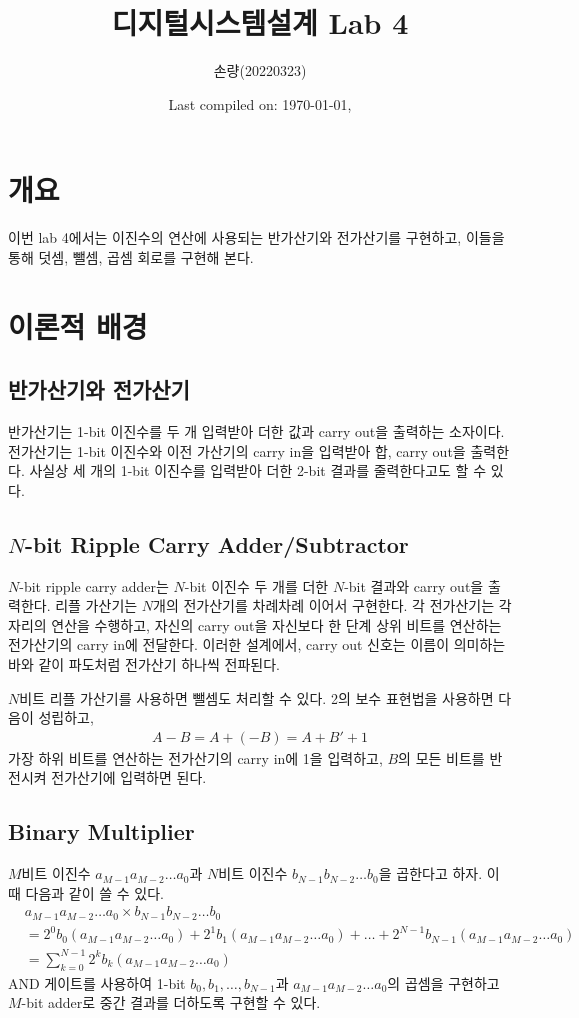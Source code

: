 \documentclass{scrartcl}
\title{디지털시스템설계 Lab 4}
\author{손량(20220323)}
\date{Last compiled on: \today, \currenttime}
\begin{document}
\maketitle

\section{개요}
이번 lab 4에서는 이진수의 연산에 사용되는 반가산기와 전가산기를 구현하고, 이들을 통해 덧셈, 뺄셈, 곱셈 회로를 구현해 본다.

\section{이론적 배경}
\subsection{반가산기와 전가산기}
반가산기는 1-bit 이진수를 두 개 입력받아 더한 값과 carry out을 출력하는 소자이다.
전가산기는 1-bit 이진수와 이전 가산기의 carry in을 입력받아 합, carry out을 출력한다.
사실상 세 개의 1-bit 이진수를 입력받아 더한 2-bit 결과를 줄력한다고도 할 수 있다.

\subsection{\(N\)-bit Ripple Carry Adder/Subtractor}
\(N\)-bit ripple carry adder는 \(N\)-bit 이진수 두 개를 더한 \(N\)-bit 결과와 carry out을 출력한다.
리플 가산기는 \(N\)개의 전가산기를 차례차례 이어서 구현한다.
각 전가산기는 각 자리의 연산을 수행하고, 자신의 carry out을 자신보다 한 단계 상위 비트를 연산하는 전가산기의 carry in에 전달한다.
이러한 설계에서, carry out 신호는 이름이 의미하는 바와 같이 파도처럼 전가산기 하나씩 전파된다.

\(N\)비트 리플 가산기를 사용하면 뺄셈도 처리할 수 있다.
2의 보수 표현법을 사용하면 다음이 성립하고,
\begin{align*}
  A - B = A + (-B) = A + B' + 1
\end{align*}
가장 하위 비트를 연산하는 전가산기의 carry in에 1을 입력하고, \(B\)의 모든 비트를 반전시켜 전가산기에 입력하면 된다.

\subsection{Binary Multiplier}
\(M\)비트 이진수 \(a_{M - 1} a_{M - 2} \dots a_0\)과 \(N\)비트 이진수 \(b_{N - 1} b_{N - 2} \dots b_0\)을 곱한다고 하자.
이때 다음과 같이 쓸 수 있다.
\begin{align*}
  &a_{M - 1} a_{M - 2} \dots a_0 \times b_{N - 1} b_{N - 2} \dots b_0 \\
  &= 2^0 b_0 (a_{M - 1} a_{M - 2} \dots a_0) + 2^1 b_1 (a_{M - 1} a_{M - 2} \dots a_0) + \dots + 2^{N - 1} b_{N - 1} (a_{M - 1} a_{M - 2} \dots a_0) \\
  &= \sum^{N - 1}_{k = 0} 2^k b_k (a_{M - 1} a_{M - 2} \dots a_0)
\end{align*}
AND 게이트를 사용하여 1-bit \(b_0, b_1, \dots, b_{N - 1}\)과 \(a_{M - 1} a_{M - 2} \dots a_0\)의 곱셈을 구현하고 \(M\)-bit adder로 중간 결과를 더하도록 구현할 수 있다.
\end{document}
